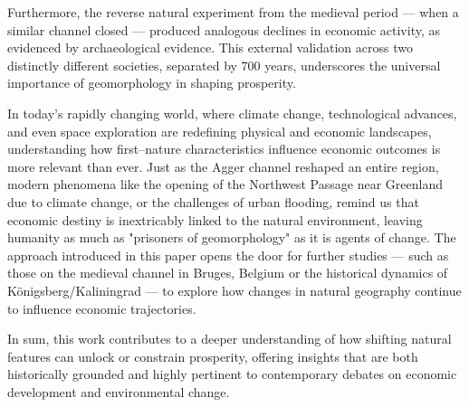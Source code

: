 \documentclass[12pt]{article}
\begin{document}
Furthermore, the reverse natural experiment from the medieval period — when a similar channel closed — produced analogous declines in economic activity, as evidenced by archaeological evidence. This external validation across two distinctly different societies, separated by 700 years, underscores the universal importance of geomorphology in shaping prosperity.

In today’s rapidly changing world, where climate change, technological advances, and even space exploration are redefining physical and economic landscapes, understanding how first–nature characteristics influence economic outcomes is more relevant than ever. Just as the Agger channel reshaped an entire region, modern phenomena like the opening of the Northwest Passage near Greenland due to climate change, or the challenges of urban flooding, remind us that economic destiny is inextricably linked to the natural environment, leaving humanity as much as "prisoners of geomorphology" as it is agents of change. The approach introduced in this paper opens the door for further studies — such as those on the medieval channel in Bruges, Belgium \citep{Houtte1966, Charlier2011} or the historical dynamics of Königsberg/Kaliningrad \citep{Britannica2018} — to explore how changes in natural geography continue to influence economic trajectories.

In sum, this work contributes to a deeper understanding of how shifting natural features can unlock or constrain prosperity, offering insights that are both historically grounded and highly pertinent to contemporary debates on economic development and environmental change.

\newpage



\normalsize
\newpage

\end{document}
